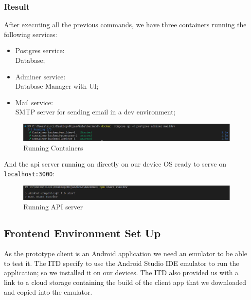 \subsubsection*{Result}
After executing all the previous commands, we have three containers running the following services:
\begin{itemize}
    \item Postgres service:\\
        Database;
    \item Adminer service: \\
        Database Manager with UI;
    \item Mail service:\\
        SMTP server for sending email in a dev environment;
\end{itemize}

\begin{figure}[H]
    \centering
    \includegraphics[width=1\linewidth]{Latex/Images/ATD/containers.png}
    \caption{Running Containers}
    \label{fig:containers}
\end{figure}

And the api server running on directly on our device OS ready to serve on \verb|localhost:3000|:

\begin{figure}[H]
    \centering
    \includegraphics[width=1\linewidth]{Latex/Images/ATD/npmrun.png}
    \caption{Running API server}
    \label{fig:containers}
\end{figure}



\subsection{Frontend Environment Set Up}
As the prototype client is an Android application we need an emulator to be able to test it. The ITD specify to use the Android Studio IDE emulator to run the application; so we installed it on our devices.
The ITD also provided us with a link to a cloud storage containing the build of the client app that we downloaded and copied into the emulator.

